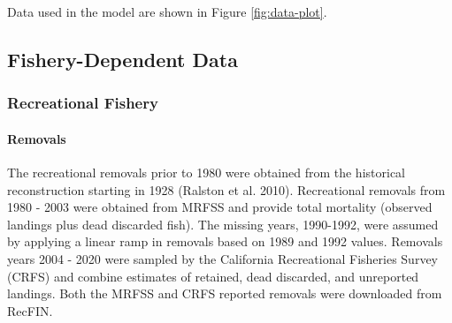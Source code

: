 \documentclass[11pt,
  english,
  a4paper,
]{article}
\begin{document}
\leavevmode\tagmcend\tagstructend


Data used in the model are shown in Figure \ref{fig:data-plot}.

\leavevmode\tagmcend\tagstructend\par


\hypertarget{fishery-dependent-data}{%
\subsection{Fishery-Dependent Data}\label{fishery-dependent-data}}

\leavevmode\tagmcend\tagstructend


\hypertarget{recreational-fishery}{%
\subsubsection{Recreational Fishery}\label{recreational-fishery}}

\leavevmode\tagmcend\tagstructend


\hypertarget{removals}{%
\paragraph{Removals}\label{removals}}

\leavevmode\tagmcend\tagstructend


The recreational removals prior to 1980 were obtained from the historical reconstruction starting in 1928 {(Ralston et al. 2010)\leavevmode\tagmcend\tagstructend}. Recreational removals from 1980 - 2003 were obtained from MRFSS and provide total mortality (observed landings plus dead discarded fish). The missing years, 1990-1992, were assumed by applying a linear ramp in removals based on 1989 and 1992 values. Removals years 2004 - 2020 were sampled by the California Recreational Fisheries Survey (CRFS) and combine estimates of retained, dead discarded, and unreported landings. Both the MRFSS and CRFS reported removals were downloaded from RecFIN.

\leavevmode\tagmcend\tagstructend\par
\end{document}
